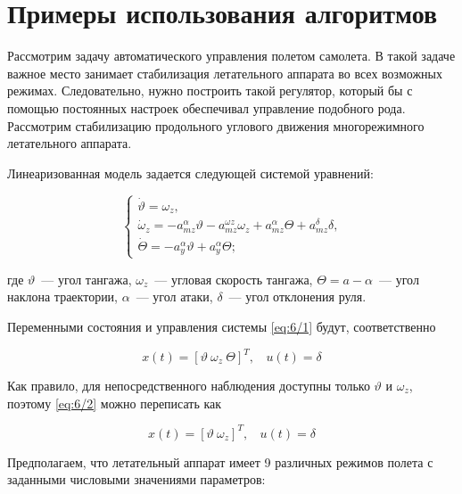 \chapter{Примеры использования алгоритмов}

Рассмотрим задачу автоматического управления полетом самолета. В такой задаче важное место занимает стабилизация летательного аппарата во всех возможных режимах. Следовательно, нужно построить такой регулятор, который бы с помощью постоянных настроек обеспечивал управление подобного рода. Рассмотрим стабилизацию продольного углового движения многорежимного летательного аппарата.\br

Линеаризованная модель задается следующей системой уравнений:

\begin{equation}
\label{eq:6/1}
\left\{ \begin{array}{l}
\dot{\vartheta} = \omega_z\mbox{,} \\
\dot{\omega}_z = -a_{mz}^\alpha\vartheta - a_{mz}^{\omega z}\omega_z + a_{mz}^\alpha\Theta + a_{mz}^\delta\delta\mbox{,} \\
\dot{\Theta} = -a_y^\alpha\vartheta + a_y^\alpha\Theta\mbox{;}
\end{array} \right.
\end{equation}

где $\vartheta$~--- угол тангажа, $\omega_z$~--- угловая скорость тангажа, $\Theta = a-\alpha$~--- угол наклона траектории, $\alpha$~--- угол атаки, $\delta$~--- угол отклонения руля.

Переменными состояния и управления системы \vref{eq:6/1} будут, соответственно

\begin{equation}
\label{eq:6/2}
x(t) = [\vartheta~\omega_z~\Theta]^T,~~~~u(t)=\delta
\end{equation}

Как правило, для непосредственного наблюдения доступны только $\vartheta$ и $\omega_z$, поэтому \ref{eq:6/2} можно переписать как

\begin{equation}
\label{eq:6/3}
x(t) = [\vartheta~\omega_z]^T,~~~~u(t)=\delta
\end{equation}

Предполагаем, что летательный аппарат имеет 9 различных режимов полета с заданными числовыми значениями параметров:

